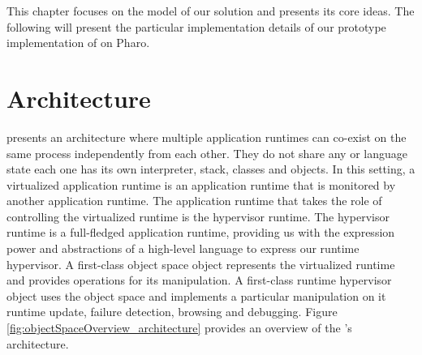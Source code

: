 This chapter focuses on the model of our solution and presents its core ideas. The following  will present the particular implementation details of our prototype implementation of \Vtt on Pharo.





\section{\Vtt Architecture} \label{sec:virtualization_overview}

\Vtt presents an architecture where multiple application runtimes can co-exist on the same process independently from each other. They do not share any \VM or language state \ie each one has its own interpreter, stack, classes and objects. In this setting, a virtualized application runtime is an application runtime that is monitored by another application runtime. The application runtime that takes the role of controlling the virtualized runtime is the hypervisor runtime. The hypervisor runtime is a full-fledged application runtime, providing us with the expression power and abstractions of a high-level language to express our runtime hypervisor. A first-class object space object represents the virtualized runtime and provides operations for its manipulation. A first-class runtime hypervisor object uses the object space and implements a particular manipulation on it \eg runtime update, failure detection, browsing and debugging. Figure \ref{fig:objectSpaceOverview_architecture} provides an overview of the \Vtt's architecture.

